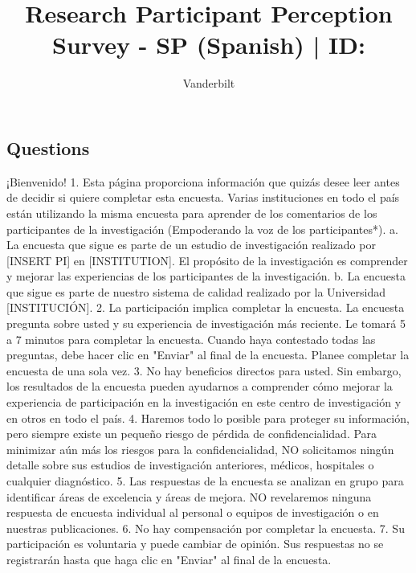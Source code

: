 \documentclass[spanish,pagemark,stamp,oneside,print_questionnaire_id]{sdapsclassic}
\author{Vanderbilt}
\title{Research Participant Perception Survey - SP (Spanish) | ID: \qid}
\begin{document}
                \begin{questionnaire}
                \begin{Form}
                    
                \section{Questions}
                    \begin{info}
                        ¡Bienvenido! 1. Esta página proporciona información que quizás desee leer antes de decidir si quiere completar esta encuesta. Varias instituciones en todo el país están utilizando la misma encuesta para aprender de los comentarios de los participantes de la investigación (Empoderando la voz de los participantes*). a. La encuesta que sigue es parte de un estudio de investigación realizado por [INSERT PI] en [INSTITUTION]. El propósito de la investigación es comprender y mejorar las experiencias de los participantes de la investigación. b. La encuesta que sigue es parte de nuestro sistema de calidad realizado por la Universidad [INSTITUCIÓN]. 2. La participación implica completar la encuesta. La encuesta pregunta sobre usted y su experiencia de investigación más reciente. Le tomará 5 a 7 minutos para completar la encuesta. Cuando haya contestado todas las preguntas, debe hacer clic en "Enviar" al final de la encuesta. Planee completar la encuesta de una sola vez. 3. No hay beneficios directos para usted. Sin embargo, los resultados de la encuesta pueden ayudarnos a comprender cómo mejorar la experiencia de participación en la investigación en este centro de investigación y en otros en todo el país. 4. Haremos todo lo posible para proteger su información, pero siempre existe un pequeño riesgo de pérdida de confidencialidad. Para minimizar aún más los riesgos para la confidencialidad, NO solicitamos ningún detalle sobre sus estudios de investigación anteriores, médicos, hospitales o cualquier diagnóstico. 5. Las respuestas de la encuesta se analizan en grupo para identificar áreas de excelencia y áreas de mejora. NO revelaremos ninguna respuesta de encuesta individual al personal o equipos de investigación o en nuestras publicaciones. 6. No hay compensación por completar la encuesta.  7. Su participación es voluntaria y puede cambiar de opinión. Sus respuestas no se registrarán hasta que haga clic en "Enviar" al final de la encuesta.
                    \end{info}
                        \begin{info}

\end{info}
\end{Form}
\end{questionnaire}
\end{document}
